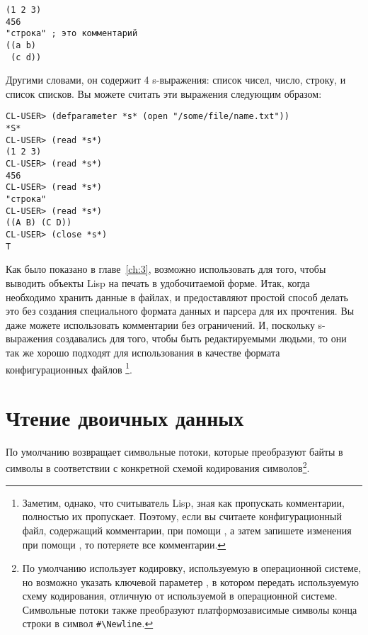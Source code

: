 \begin{lstlisting}
(1 2 3)
456
"строка" ; это комментарий
((a b)
 (c d))
\end{lstlisting}

Другими словами, он содержит 4 s-выражения: список чисел, число, строку, и список
списков. Вы можете считать эти выражения следующим образом:

\begin{lstlisting}
CL-USER> (defparameter *s* (open "/some/file/name.txt"))
*S*
CL-USER> (read *s*)
(1 2 3)
CL-USER> (read *s*)
456
CL-USER> (read *s*)
"строка"
CL-USER> (read *s*)
((A B) (C D))
CL-USER> (close *s*)
T
\end{lstlisting}

Как было показано в главе~\ref{ch:3}, возможно использовать  для того, чтобы выводить
объекты Lisp на печать в удобочитаемой форме. Итак, когда необходимо хранить данные в
файлах,  и  предоставляют простой способ делать это без создания
специального формата данных и парсера для их прочтения. Вы даже можете использовать
комментарии без ограничений. И, поскольку s-выражения создавались для того, чтобы быть
редактируемыми людьми, то они так же хорошо подходят для использования в качестве формата
конфигурационных файлов \footnote{Заметим, однако, что считыватель Lisp, зная как
  пропускать комментарии, полностью их пропускает. Поэтому, если вы считаете
  конфигурационный файл, содержащий комментарии, при помощи , а затем запишете
  изменения при помощи , то потеряете все комментарии.}.

\section{Чтение двоичных данных}

По умолчанию  возвращает символьные потоки, которые преобразуют байты в символы
в соответствии с конкретной схемой кодирования символов\footnote{По умолчанию 
  использует кодировку, используемую в операционной системе, но возможно указать ключевой
  параметер , в котором передать используемую схему кодирования,
  отличную от используемой в операционной системе. Символьные потоки также преобразуют
  платформозависимые символы конца строки в символ \lstinline!#\Newline!.}.

